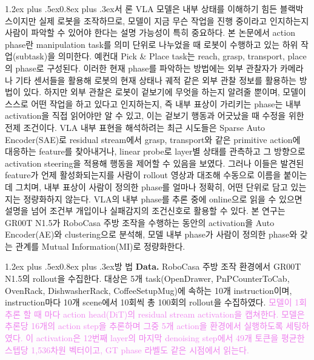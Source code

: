 \documentclass[a4paper,twocolumn,9pt]{extarticle}
\makeatletter
\newcommand{\rev}[1]{\textcolor{violet}{#1}}  %
\renewcommand\section{\@startsection{section}{1}{\z@}%
  {1.2ex plus .5ex}{0.8ex plus .3ex}{\normalsize\bfseries}}
\makeatother
\begin{document}
\section{서 론}
VLA 모델은 내부 상태를 이해하기 힘든 블랙박스이지만 실제 로봇을 조작하므로, 모델이 지금 무슨 작업을 진행 중이라고 인지하는지 사람이 파악할 수 있어야 한다는 설명 가능성이 특히 중요하다. 본 논문에서 action phase란 manipulation task를 의미 단위로 나누었을 때 로봇이 수행하고 있는 하위 작업(subtask)을 의미한다. 예컨대 Pick \& Place task는 reach, grasp, transport, place의 phase로 구성된다\cite{options}. 이러한 현재 phase를 파악하는 방법에는 외부 관찰자가 카메라나 기타 센서들을 활용해 로봇의 현재 상태나 궤적 같은 외부 관찰 정보를 활용하는 방법이 있다\cite{lotus}. 하지만 외부 관찰은 로봇이 겉보기에 무엇을 하는지 알려줄 뿐이며, 모델이 스스로 어떤 작업을 하고 있다고 인지하는지, 즉 내부 표상이 가리키는 phase는 내부 activation을 직접 읽어야만 알 수 있고, 이는 겉보기 행동과 어긋났을 때 수정을 위한 전제 조건이다. VLA 내부 표현을 해석하려는 최근 시도들은
Sparse Auto Encoder(SAE)로 residual stream에서 grasp, transport와 같은 primitive action에 대응하는 feature를 찾아내거나\cite{saevla,egsae}, linear probe로 layer별 상태를 관측하고 그 방향으로 activation steering을 적용해 행동을 제어할 수 있음을 보였다\cite{observing,mechinterp}. 그러나 이들은 발견된 feature가 언제 활성화되는지를 사람이 rollout 영상과 대조해 수동으로 이름을 붙이는 데 그치며, 내부 표상이 사람이 정의한 phase를 얼마나 정확히, 어떤 단위로 담고 있는지는 정량화하지 않는다. VLA의 내부 phase를 추론 중에 online으로 읽을 수 있으면 설명을 넘어 조건부 개입이나 실패감지\cite{safe}의 조건신호로 활용할 수 있다. 본 연구는 GR00T N1.5\cite{groot}가 RoboCasa\cite{robocasa} 주방 조작을 수행하는 동안의 activation을 Auto Encoder(AE)와 clustering으로 분석해, 모델 내부 phase가 사람이 정의한 phase와 갖는 관계를 Mutual Information(MI)로 정량화한다. 

\section{방 법}
\textbf{Data. } RoboCasa 주방 조작 환경에서 GR00T N1.5의 rollout을 수집한다. 대상은 5개 task(OpenDrawer, PnPCounterToCab, OvenRack, DishwasherRack, CoffeeSetupMug)에 속하는 10개 instruction이며, instruction마다 10개 scene에서 10회씩 총 100회의 rollout을 수집하였다. \rev{모델이 1회 추론 할 때 마다 action head(DiT)의 residual stream activation을 캡쳐한다. 모델은 추론당 16개의 action step을 추론하며 그중 5개 action을 환경에서 실행하도록 세팅하였다. 이 activation은 12번째 layer의 마지막 denoising step에서 49개 토큰을 평균한 스텝당 1{,}536차원 벡터이고, GT phase 라벨도 같은 시점에서 읽는다.}
\end{document}
